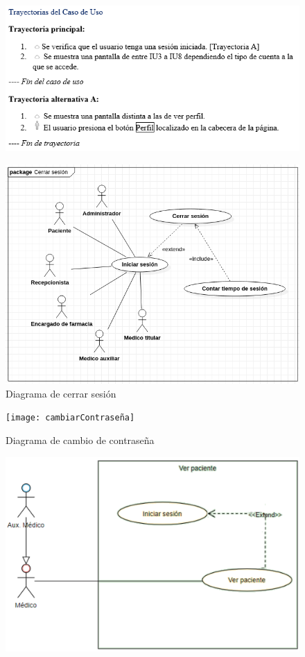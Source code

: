 \documentclass[12pt,letterpaper]{article}
\begin{document}
{\begin{figure}[H]
        \end{figure}
        \begin{figure}[H]
            \centering
            \includegraphics [scale=0.9]{trayectoriaVerPerfil}
        \end{figure}
        \begin{figure}[H]
            \centering
            \includegraphics [scale=0.6]{cerrarSesion}
            \caption{Diagrama de cerrar sesión}
        \end{figure}
        \begin{figure}[H]
            \centering
            \texttt{[image: cambiarContraseña]}
            \caption{Diagrama de cambio de contraseña}
        \end{figure}
        \begin{figure}[H]
            \centering
            \includegraphics [scale=0.35]{verPaciente}

\end{figure}}
\end{document}
